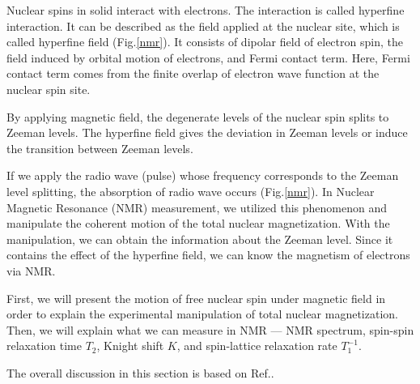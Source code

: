 Nuclear spins in solid interact with electrons.
The interaction is called hyperfine interaction.
It can be described as the field applied at the nuclear site, which is called hyperfine field (Fig.\ref{nmr}).
It consists of dipolar field of electron spin, the field induced by orbital motion of electrons, and Fermi contact term.
Here, Fermi contact term comes from the finite overlap of electron wave function at the nuclear spin site.

By applying magnetic field, the degenerate levels of the nuclear spin splits to Zeeman levels.
The hyperfine field gives the deviation in Zeeman levels or induce the transition between Zeeman levels.

If we apply the radio wave (pulse) whose frequency corresponds to the Zeeman level splitting, the absorption of radio wave occurs (Fig.\ref{nmr}).
In Nuclear Magnetic Resonance (NMR) measurement, we utilized this phenomenon and manipulate the coherent motion of the total nuclear magnetization.
With the manipulation, we can obtain the information about the Zeeman level.
Since it contains the effect of the hyperfine field, we can know the magnetism of electrons via NMR.

First, we will present the motion of free nuclear spin under magnetic field in order to explain the experimental manipulation of total nuclear magnetization.
Then, we will explain what we can measure in NMR --- NMR spectrum, spin-spin relaxation time $T_2$, Knight shift $K$, and spin-lattice relaxation rate $T^{-1}_1$.

The overall discussion in this section is based on Ref.\cite{Kitaoka, Asayama, Takigawa}.

